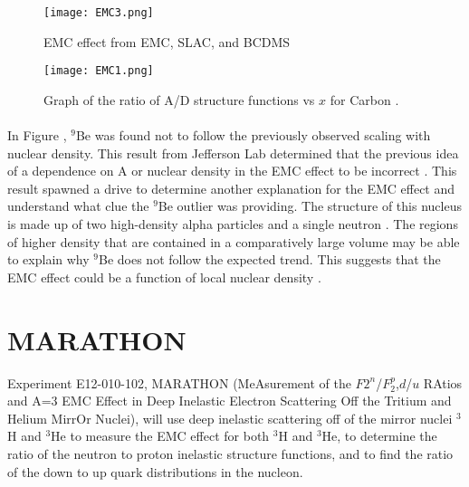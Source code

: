 \begin{figure}[h]
\centering
\caption{EMC effect from EMC, SLAC, and BCDMS \cite{Norton}}
\label{EMC3}
\centering
\texttt{[image: EMC3.png]}
\end{figure}

\begin{figure}[h]
\centering
 \caption{ Graph of the ratio of A/D structure functions vs $x$ for Carbon \cite{CC}.}
 \label{EMC 1}
 \texttt{[image: EMC1.png]} 
 \end{figure} 
 

\paragraph{} In Figure , $^9$Be was found not to follow the previously observed scaling with nuclear density. This result from Jefferson Lab determined that the previous idea of a dependence on A or nuclear density in the EMC effect to be incorrect \cite{seeley}. This result spawned a drive to determine another explanation for the EMC effect and understand what clue the $^9$Be outlier was providing. The structure of this nucleus is made up of two high-density alpha particles and a single neutron \cite{ajppt}. The regions of higher density that are contained in a comparatively large volume may be able to explain why $^9$Be does not follow the expected trend. This suggests that the EMC effect could be a function of local nuclear density \cite{seeley}. 




\section{MARATHON}
Experiment E12-010-102, MARATHON (MeAsurement of the $F2^n$/$F_2^p$,$d$/$u$ RAtios and A=3 EMC Effect in Deep Inelastic Electron Scattering Off the Tritium and Helium MirrOr Nuclei), will use deep inelastic scattering off of the mirror nuclei $^3$H and $^3$He to measure the EMC effect for both $^3$H and $^3$He, to determine the ratio of the neutron to proton inelastic structure functions, and to find the ratio of the down to up quark distributions in the nucleon.

